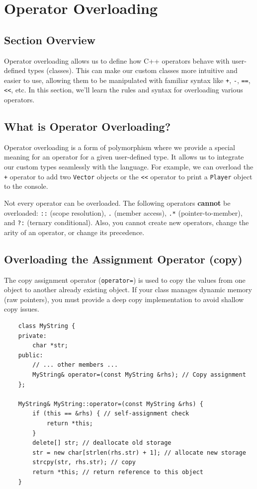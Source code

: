 \section{Operator Overloading}

\subsection{Section Overview}
Operator overloading allows us to define how C++ operators behave with user-defined types (classes). This can make our custom classes more intuitive and easier to use, allowing them to be manipulated with familiar syntax like \texttt{+}, \texttt{-}, \texttt{==}, \texttt{<<}, etc. In this section, we'll learn the rules and syntax for overloading various operators.

\subsection{What is Operator Overloading?}
Operator overloading is a form of polymorphism where we provide a special meaning for an operator for a given user-defined type. It allows us to integrate our custom types seamlessly with the language. For example, we can overload the \texttt{+} operator to add two \texttt{Vector} objects or the \texttt{<<} operator to print a \texttt{Player} object to the console.

\begin{remark}
	Not every operator can be overloaded. The following operators \textbf{cannot} be overloaded: \texttt{::} (scope resolution), \texttt{.} (member access), \texttt{.*} (pointer-to-member), and \texttt{?:} (ternary conditional). Also, you cannot create new operators, change the arity of an operator, or change its precedence.
\end{remark}

\subsection{Overloading the Assignment Operator (copy)}
The copy assignment operator (\texttt{operator=}) is used to copy the values from one object to another already existing object. If your class manages dynamic memory (raw pointers), you must provide a deep copy implementation to avoid shallow copy issues.
\begin{lstlisting}
	class MyString {
	private:
		char *str;
	public:
		// ... other members ...
		MyString& operator=(const MyString &rhs); // Copy assignment
	};

	MyString& MyString::operator=(const MyString &rhs) {
		if (this == &rhs) { // self-assignment check
			return *this;
		}
		delete[] str; // deallocate old storage
		str = new char[strlen(rhs.str) + 1]; // allocate new storage
		strcpy(str, rhs.str); // copy
		return *this; // return reference to this object
	}
\end{lstlisting}

